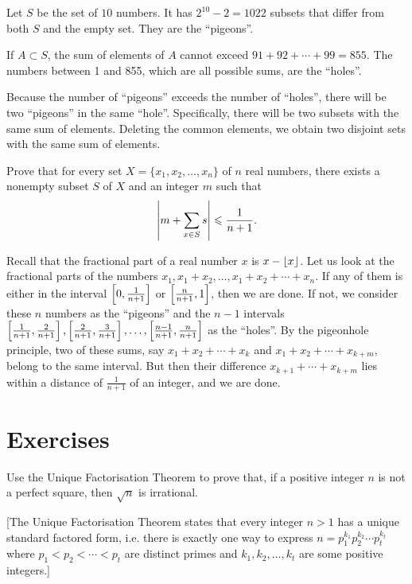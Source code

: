 \begin{solution}
Let $S$ be the set of $10$ numbers. It has $2^{10}-2=1022$ subsets that differ from both $S$ and the empty set. They are the ``pigeons''.

If $A\subset S$, the sum of elements of $A$ cannot exceed $91+92+\cdots+99=855$. The numbers between 1 and 855, which are all possible sums, are the ``holes''.

Because the number of ``pigeons'' exceeds the number of ``holes'', there will be two ``pigeons'' in the same ``hole''. Specifically, there will be two subsets with the same sum of elements. Deleting the common elements, we obtain two disjoint sets with the same sum of elements.
\end{solution}

\begin{exercise}[Putnam 2006]
Prove that for every set $X=\{x_1,x_2,\dots,x_n\}$ of $n$ real numbers, there exists a nonempty subset $S$ of $X$ and an integer $m$ such that
\[\left|m+\sum_{x\in S}s\right|\leqslant\frac{1}{n+1}.\]
\end{exercise}

\begin{solution}
Recall that the fractional part of a real number $x$ is $x-\left\lfloor x \right\rfloor$. Let us look at the fractional parts of the numbers $x_1,x_1+x_2,\dots,x_1+x_2+\cdots+x_n$. If any of them is either in the interval $\left[0,\frac{1}{n+1}\right]$ or $\left[\frac{n}{n+1},1\right]$, then we are done. If not, we consider these $n$ numbers as the ``pigeons'' and the $n-1$ intervals $\left[\frac{1}{n+1},\frac{2}{n+1}\right],\left[\frac{2}{n+1},\frac{3}{n+1}\right],\dots,\left[\frac{n-1}{n+1},\frac{n}{n+1}\right]$ as the ``holes''. By the pigeonhole principle, two of these sums, say $x_1+x_2+\cdots+x_k$ and $x_1+x_2+\cdots+x_{k+m}$, belong to the same interval. But then their difference $x_{k+1}+\cdots+x_{k+m}$ lies within a distance of $\frac{1}{n+1}$ of an integer, and we are done.
\end{solution}
\pagebreak

\section*{Exercises}
\begin{prbm}
Use the Unique Factorisation Theorem to prove that, if a positive integer $n$ is not a perfect square, then $\sqrt{n}$ is irrational.

[The Unique Factorisation Theorem states that every integer $n>1$ has a unique standard factored form, i.e. there is exactly one way to express $n=p_1^{k_1}p_2^{k_2}\cdots p_t^{k_t}$ where $p_1<p_2<\cdots<p_t$ are distinct primes and $k_1,k_2,\dots,k_t$ are some positive integers.]
\end{prbm}

